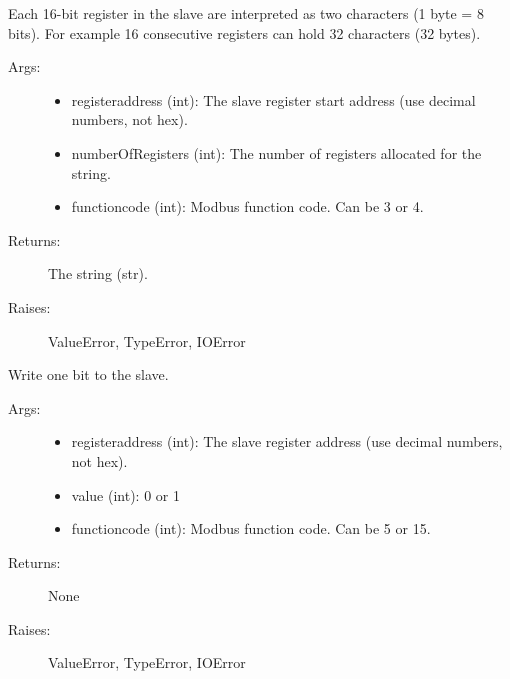 \documentclass[letterpaper,10pt,english]{sphinxmanual}
\begin{document}
\begin{fulllineitems}
\begin{fulllineitems}
Each 16-bit register in the slave are interpreted as two characters (1 byte = 8 bits).
For example 16 consecutive registers can hold 32 characters (32 bytes).
\begin{description}
\item[{Args:}] \leavevmode\begin{itemize}
\item {} 
registeraddress (int): The slave register start address (use decimal numbers, not hex).

\item {} 
numberOfRegisters (int): The number of registers allocated for the string.

\item {} 
functioncode (int): Modbus function code. Can be 3 or 4.

\end{itemize}

\item[{Returns:}] \leavevmode
The string (str).

\item[{Raises:}] \leavevmode
ValueError, TypeError, IOError

\end{description}

\end{fulllineitems}


\begin{fulllineitems}
\label{minimalmodbus:minimalmodbus.Instrument.write_bit}
Write one bit to the slave.
\begin{description}
\item[{Args:}] \leavevmode\begin{itemize}
\item {} 
registeraddress (int): The slave register address (use decimal numbers, not hex).

\item {} 
value (int): 0 or 1

\item {} 
functioncode (int): Modbus function code. Can be 5 or 15.

\end{itemize}

\item[{Returns:}] \leavevmode
None

\item[{Raises:}] \leavevmode
ValueError, TypeError, IOError


\end{description}
\end{fulllineitems}
\end{fulllineitems}
\end{document}
